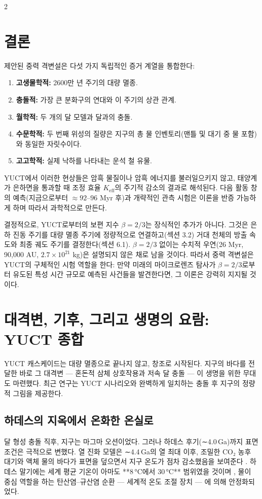 \documentclass[12pt,a4paper]{article}
\begin{document}
	\begin{multicols}{2}
		
		\section{결론}
		제안된 중력 격변설은 다섯 가지 독립적인 증거 계열을 통합한다:
		\begin{enumerate}
			\item \textbf{고생물학적:} 2600만 년 주기의 대량 멸종.
			\item \textbf{충돌적:} 가장 큰 분화구의 연대와 이 주기의 상관 관계.
			\item \textbf{월학적:} 두 개의 달 모델과 달과의 충돌.
			\item \textbf{수문학적:} 두 번째 위성의 질량은 지구의 총 물 인벤토리(맨틀 및 대기 중 물 포함)와 동일한 자릿수이다.
			\item \textbf{고고학적:} 실제 낙하를 나타내는 운석 철 유물.
		\end{enumerate}
		YUCT에서 이러한 현상들은 암흑 물질이나 암흑 에너지를 불러일으키지 않고, 태양계가 은하면을 통과할 때 조정 효율 \(K_{\mathrm{eff}}\)의 주기적 감소의 결과로 해석된다. 다음 활동 창의 예측(지금으로부터 \(\approx 92\)–\(96\) Myr 후)과 개략적인 관측 시험은 이론을 반증 가능하게 하며 따라서 과학적으로 만든다.
		
		결정적으로, YUCT로부터의 보편 지수 \(\beta = 2/3\)는 장식적인 추가가 아니다. 그것은 은하 진동 주기를 대량 멸종 주기에 정량적으로 연결하고(섹션 3.2) 거대 천체의 방출 속도와 최종 궤도 주기를 결정한다(섹션 6.1). \(\beta = 2/3\) 없이는 수치적 우연(26 Myr, 90,000 AU, \(2.7\times10^{21}\) kg)은 설명되지 않은 채로 남을 것이다. 따라서 중력 격변설은 YUCT의 구체적인 시험 역할을 한다: 만약 미래의 마이크로렌즈 탐사가 \(\beta = 2/3\)로부터 유도된 특성 시간 규모로 예측된 사건들을 발견한다면, 그 이론은 강력히 지지될 것이다.
		
		\section{대격변, 기후, 그리고 생명의 요람: YUCT 종합}
		YUCT 캐스케이드는 대량 멸종으로 끝나지 않고, 창조로 시작된다. 지구의 바다를 전달한 바로 그 대격변 — 혼돈적 삼체 상호작용과 저속 달 충돌 — 이 생명을 위한 무대도 마련했다. 최근 연구는 YUCT 시나리오와 완벽하게 일치하는 충돌 후 지구의 정량적 그림을 제공한다.
		
		\subsection{하데스의 지옥에서 온화한 온실로}
		달 형성 충돌 직후, 지구는 마그마 오션이었다. 그러나 하데스 후기(∼4.0 Ga)까지 표면 조건은 극적으로 변했다. 열 진화 모델은 ∼4.4 Ga의 열 최대 이후, 조밀한 CO₂ 농후 대기와 액체 물의 바다가 표면을 덮으면서 지구 온도가 점차 감소했음을 보여준다 \cite{Korenaga2017}. 하데스 말기에는 세계 평균 기온이 아마도 **8 °C에서 30 °C** 범위였을 것이며 \cite{Charnay2017}, 물이 중심 역할을 하는 탄산염–규산염 순환 — 세계적 온도 조절 장치 — 에 의해 안정화되었다.
		

\end{multicols}
\end{document}
